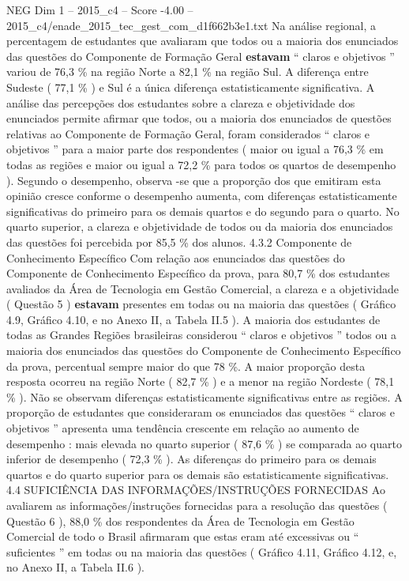 \begin{textsample}{NEG Dim 1 – 2015\_c4 – Score -4.00 – 2015\_c4/enade\_2015\_tec\_gest\_com\_d1f662b3e1.txt}
Na análise regional, a percentagem de estudantes que avaliaram que todos ou a maioria dos enunciados das questões do Componente de Formação Geral \textbf{estavam} “ claros e objetivos ” variou de 76,3 \% na região Norte a 82,1 \% na região Sul.
A diferença entre Sudeste ( 77,1 \% ) e Sul é a única diferença estatisticamente significativa.
A análise das percepções dos estudantes sobre a clareza e objetividade dos enunciados permite afirmar que todos, ou a maioria dos enunciados de questões relativas ao Componente de Formação Geral, foram considerados “ claros e objetivos ” para a maior parte dos respondentes ( maior ou igual a 76,3 \% em todas as regiões e maior ou igual a 72,2 \% para todos os quartos de desempenho ).
Segundo o desempenho, observa -se que a proporção dos que emitiram esta opinião cresce conforme o desempenho aumenta, com diferenças estatisticamente significativas do primeiro para os demais quartos e do segundo para o quarto.
No quarto superior, a clareza e objetividade de todos ou da maioria dos enunciados das questões foi percebida por 85,5 \% dos alunos. 4.3.2 Componente de Conhecimento Específico Com relação aos enunciados das questões do Componente de Conhecimento Específico da prova, para 80,7 \% dos estudantes avaliados da Área de Tecnologia em Gestão Comercial, a clareza e a objetividade ( Questão 5 ) \textbf{estavam} presentes em todas ou na maioria das questões ( Gráfico 4.9, Gráfico 4.10, e no Anexo II, a Tabela II.5 ).
A maioria dos estudantes de todas as Grandes Regiões brasileiras considerou “ claros e objetivos ” todos ou a maioria dos enunciados das questões do Componente de Conhecimento Específico da prova, percentual sempre maior do que 78 \%.
A maior proporção desta resposta ocorreu na região Norte ( 82,7 \% ) e a menor na região Nordeste ( 78,1 \% ).
Não se observam diferenças estatisticamente significativas entre as regiões.
A proporção de estudantes que consideraram os enunciados das questões “ claros e objetivos ” apresenta uma tendência crescente em relação ao aumento de desempenho : mais elevada no quarto superior ( 87,6 \% ) se comparada ao quarto inferior de desempenho ( 72,3 \% ).
As diferenças do primeiro para os demais quartos e do quarto superior para os demais são estatisticamente significativas. 4.4 SUFICIÊNCIA DAS INFORMAÇÕES/INSTRUÇÕES FORNECIDAS Ao avaliarem as informações/instruções fornecidas para a resolução das questões ( Questão 6 ), 88,0 \% dos respondentes da Área de Tecnologia em Gestão Comercial de todo o Brasil afirmaram que estas eram até excessivas ou “ suficientes ” em todas ou na maioria das questões ( Gráfico 4.11, Gráfico 4.12, e, no Anexo II, a Tabela II.6 ).

\end{textsample}
